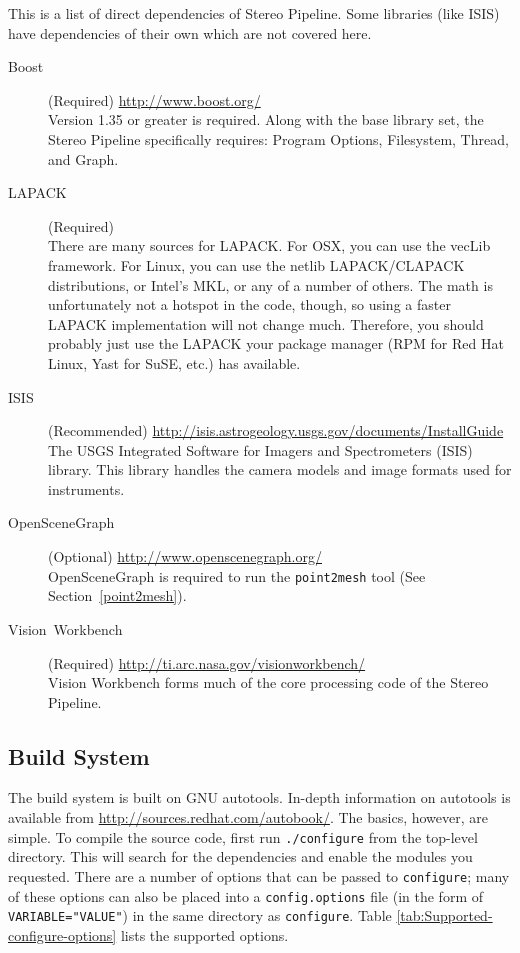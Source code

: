 This is a list of direct dependencies of Stereo Pipeline. Some libraries
(like \ac{ISIS}) have dependencies of their own which are not covered here.

\begin{description}
\item [{Boost}] (Required) \url{http://www.boost.org/}\\
Version 1.35 or greater is required. Along with the base library
set, the Stereo Pipeline specifically requires: Program Options, Filesystem,
Thread, and Graph.

\item [{LAPACK}] (Required)\\
There are many sources for LAPACK\@. For OSX, you can use the
vecLib framework. For Linux, you can use the netlib LAPACK/CLAPACK
distributions, or Intel's MKL, or any of a number of others. The math
is unfortunately not a hotspot in the code, though, so using a faster
LAPACK implementation will not change much. Therefore, you should
probably just use the LAPACK your package manager (RPM for Red Hat
Linux, Yast for SuSE, etc.) has available.

\item [{ISIS}] (Recommended) \url{http://isis.astrogeology.usgs.gov/documents/InstallGuide}\\
The USGS Integrated Software for Imagers and Spectrometers (ISIS) library. This
library handles the camera models and image formats used for instruments.

\item [{OpenSceneGraph}] (Optional) \url{http://www.openscenegraph.org/}\\
OpenSceneGraph is required to run the \texttt{point2mesh} tool
(See Section~\ref{point2mesh}).

\item [{Vision~Workbench}] (Required) \url{http://ti.arc.nasa.gov/visionworkbench/}\\
Vision Workbench forms much of the core processing code of the
Stereo Pipeline.

\end{description}

\subsection{Build System}

The build system is built on GNU autotools. In-depth information on
autotools is available from \url{http://sources.redhat.com/autobook/}.
The basics, however, are simple. To compile the source code, first
run \verb#./configure# from the top-level directory. This will search
for the dependencies and enable the modules you requested. There are
a number of options that can be passed to \verb#configure#; many
of these options can also be placed into a \verb#config.options#
file (in the form of \verb#VARIABLE="VALUE"#) in the same directory
as \verb#configure#. Table \ref{tab:Supported-configure-options}
lists the supported options.

